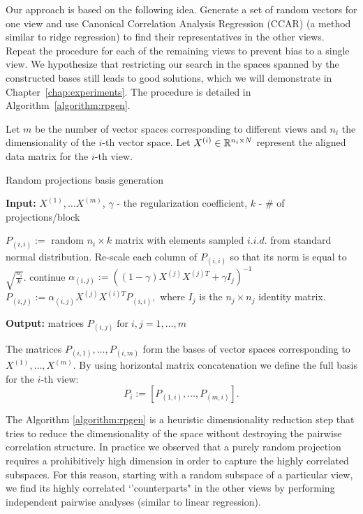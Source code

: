 Our approach is based on the following idea. Generate a set of random vectors for one view and use
Canonical Correlation Analysis Regression (CCAR)\cite{ccar} (a method similar to ridge regression)
to find their representatives in the other views. Repeat the procedure for each of the remaining views
to prevent bias to a single view. We hypothesize that restricting our search in the spaces spanned
by the constructed bases still leads to good solutions, which we will demonstrate in Chapter~\ref{chap:experiments}.
The procedure is detailed in Algorithm~\ref{algorithm:rpgen}.

Let $m$ be the number of vector spaces corresponding to different
views and $n_i$ the dimensionality of the $i$-th vector
space. Let $X^{(i)} \in \mathbb{R}^{n_i \times N}$ represent the aligned
data matrix for the $i$-th view.


\begin{algorithm}
\caption{Random projections basis generation}
\label{algorithm:rpgen}
{\bf Input:} $X^{(1)},\ldots X^{(m)}$, $\gamma$ - the regularization coefficient, $k$ - \# of projections/block
\begin{algorithmic}
\STATE $P_{(i,i)} :=$ random $n_i \times k$ matrix with elements sampled $i.i.d.$ from standard normal distribution.
\STATE Re-scale each column of $P_{(i,i)}$ so that its norm is equal to $\sqrt{\frac{n_i}{k}}$.
 \STATE continue
\ENDIF
\STATE  $\alpha_{(i,j)} :=  \left(\left(1-\gamma\right) X^{(j)} X^{(j)T} + \gamma  I_j \right)^{-1}$
\STATE  $P_{(i,j)} :=  \alpha_{(i,j)} X^{(j)} X^{(i)T}  P_{(i,i)},$ where $I_j$ is the $n_j \times n_j$ identity matrix.
\ENDFOR
\ENDFOR
\\
\end{algorithmic}
{\bf Output:} matrices $P_{(i,j)} \;\text{for}\; i,j = 1,\ldots,m$
\end{algorithm}
\begin{sloppypar}
The matrices $P_{(i,1)}, \ldots, P_{(i,m)}$ form the bases of
vector spaces corresponding to $X^{(1)},\ldots, X^{(m)}$. By using horizontal
matrix concatenation we define the full basis for the $i$-th view:
\begin{equation}\label{eq:rp_projectors}
P_i := \left[P_{(1,i)}, \ldots, P_{(m,i)}\right].
\end{equation}
\end{sloppypar}

The Algorithm \ref{algorithm:rpgen} is a heuristic dimensionality reduction step that tries to reduce the dimensionality of the space
without destroying the pairwise correlation structure. In practice we observed that a purely random projection requires a prohibitively
high dimension in order to capture the highly correlated subspaces. For this reason, starting with a random subspace of a particular view,
we find its highly correlated `'counterparts" in the other views by performing independent pairwise analyses (similar to linear
regression).

